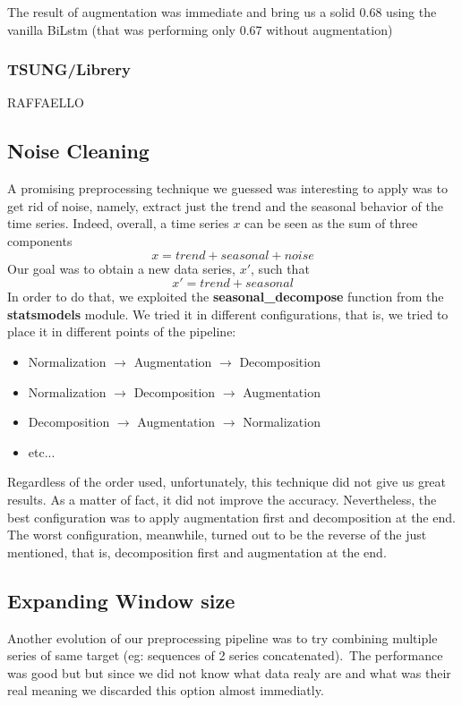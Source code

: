 \documentclass[11pt]{article}
\begin{document}
The result of augmentation was immediate and bring us a solid 0.68 using the vanilla BiLstm (that was performing only 0.67 without augmentation)
\subsubsection{TSUNG/Librery}
 RAFFAELLO
\subsection{Noise Cleaning}
A promising preprocessing technique we guessed was interesting to apply was to get rid of noise, namely, extract just the trend and the seasonal behavior of the time series. Indeed, overall, a time series $x$ can be seen as the sum of three components
\begin{equation*}
    x = trend + seasonal + noise
\end{equation*}
Our goal was to obtain a new data series, $x'$, such that
\begin{equation*}
    x' = trend + seasonal
\end{equation*}
In order to do that, we exploited the \textbf{seasonal\_decompose} function from the \textbf{statsmodels} module. We tried it in different configurations, that is, we tried to place it in different points of the pipeline:
\begin{itemize}
    \item Normalization $\rightarrow$ Augmentation $\rightarrow$ Decomposition
    \item Normalization $\rightarrow$ Decomposition $\rightarrow$ Augmentation
    \item Decomposition $\rightarrow$ Augmentation $\rightarrow$ Normalization
    \item etc...
\end{itemize}
Regardless of the order used, unfortunately, this technique did not give us great results. As a matter of fact, it did not improve the accuracy. Nevertheless, the best configuration was to apply augmentation first and decomposition at the end. The worst configuration, meanwhile, turned out to be the reverse of the just mentioned, that is, decomposition first and augmentation at the end.
\subsection{Expanding Window size}
Another evolution of our preprocessing pipeline was to try combining multiple series of same target (eg: sequences of 2 series concatenated).\
The performance was good but  but since we did not know what data realy are and what was their real meaning we discarded this option almost immediatly.
\end{document}
